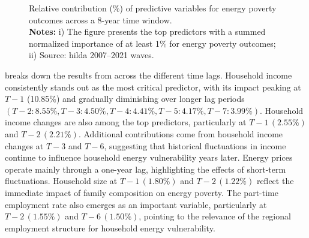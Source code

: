 \documentclass[preprint,authoryear,12pt]{elsarticle}
\begin{document}
\begin{figure}[h!]
\centering
\resizebox{\textwidth}{!}{}
\caption{Relative contribution  (\%) of predictive variables for energy poverty outcomes across a 8-year time window.\\
\small
{\bf Notes:} i) The figure presents the top predictors with a summed normalized importance of at least 1\% for energy poverty outcomes; ii) Source: \Gls{hilda} 2007--2021 waves.}
\label{fig:figure1}
\end{figure}

 breaks down the results from  across the different time lags. Household income consistently stands out as the most critical predictor, with its impact peaking at $T-1$ (10.85\%) and gradually diminishing over longer lag periods $(T-2: 8.55\%, T-3: 4.50\%, T-4: 4.41\%, T-5: 4.17\%, T-7: 3.99\%)$. Household income changes are also among the top predictors, particularly at $T-1\,(2.55\%)$ and $T-2\,(2.21\%)$. Additional contributions come from household income changes at $T-3$ and $T-6$, suggesting that historical fluctuations in income continue to influence household energy vulnerability years later. Energy prices operate mainly through a one-year lag, highlighting the effects of short-term fluctuations. Household size at $T-1\,(1.80\%)$ and $T-2\,(1.22\%)$ reflect the immediate impact of family composition on energy poverty. The part-time employment rate also emerges as an important variable, particularly at $T-2\,(1.55\%)$ and $T-6\,(1.50\%)$, pointing to the relevance of the regional employment structure for household energy vulnerability. 
\end{document}
